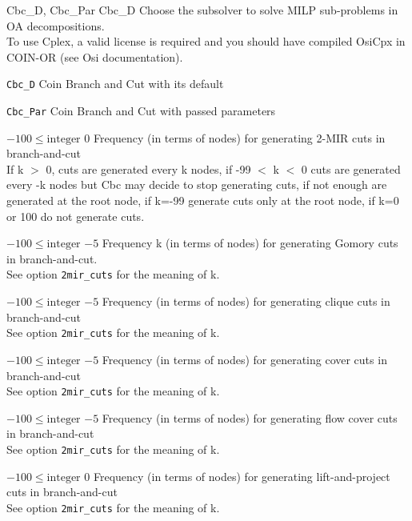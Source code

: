 %
{Cbc\_D, Cbc\_Par}%
{Cbc\_D}%
{Choose the subsolver to solve MILP sub-problems in OA decompositions.\\
 To use Cplex, a valid license is required and you should have compiled OsiCpx in COIN-OR  (see Osi documentation).}%
{\begin{list}{}{
\setlength{\parsep}{0em}
\setlength{\leftmargin}{5ex}
\setlength{\labelwidth}{2ex}
\setlength{\itemindent}{0ex}
\setlength{\topsep}{0pt}}
\item[\texttt{Cbc\_D}] Coin Branch and Cut with its default
\item[\texttt{Cbc\_Par}] Coin Branch and Cut with passed parameters
\end{list}
}

%
{$-100\leq\textrm{integer}$}%
{$0$}%
{Frequency (in terms of nodes) for generating 2-MIR cuts in branch-and-cut\\
If k $>$ 0, cuts are generated every k nodes, if -99 $<$ k $<$ 0 cuts are generated every -k nodes but Cbc may decide to stop generating cuts, if not enough are generated at the root node, if k=-99 generate cuts only at the root node, if k=0 or 100 do not generate cuts.}%
{}

%
{$-100\leq\textrm{integer}$}%
{$-5$}%
{Frequency k (in terms of nodes) for generating Gomory cuts in branch-and-cut.\\
See option \texttt{2mir\_cuts} for the meaning of k.}%
{}

%
{$-100\leq\textrm{integer}$}%
{$-5$}%
{Frequency (in terms of nodes) for generating clique cuts in branch-and-cut\\
See option \texttt{2mir\_cuts} for the meaning of k.}%
{}

%
{$-100\leq\textrm{integer}$}%
{$-5$}%
{Frequency (in terms of nodes) for generating cover cuts in branch-and-cut\\
See option \texttt{2mir\_cuts} for the meaning of k.}%
{}

%
{$-100\leq\textrm{integer}$}%
{$-5$}%
{Frequency (in terms of nodes) for generating flow cover cuts in branch-and-cut\\
See option \texttt{2mir\_cuts} for the meaning of k.}%
{}

%
{$-100\leq\textrm{integer}$}%
{$0$}%
{Frequency (in terms of nodes) for generating lift-and-project cuts in branch-and-cut\\
See option \texttt{2mir\_cuts} for the meaning of k.}%
{}

